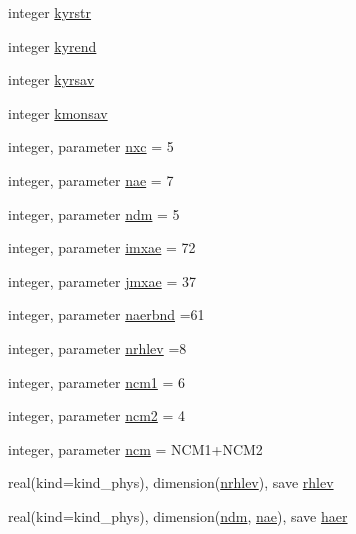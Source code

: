 \begin{DoxyCompactItemize}
\item 
integer \hyperlink{group__module__radiation__aerosols_gaf224f7d7991e3d48aeaa4d221da50f41}{kyrstr}
\item 
integer \hyperlink{group__module__radiation__aerosols_ga79127786cce93bccf8749ef8c85f6467}{kyrend}
\item 
integer \hyperlink{group__module__radiation__aerosols_ga928c08857f866e4b848873a23a1d49e7}{kyrsav}
\item 
integer \hyperlink{group__module__radiation__aerosols_ga302ae8a5aa2b8fb08ad366ef124cee45}{kmonsav}
\item 
integer, parameter \hyperlink{group__module__radiation__aerosols_ga1fffbb55ad2986a216b721a6c103c4cf}{nxc} = 5
\item 
integer, parameter \hyperlink{group__module__radiation__aerosols_ga45121ca4dcb3194e8afb4090fa810657}{nae} = 7
\item 
integer, parameter \hyperlink{group__module__radiation__aerosols_gae77b22f76f193cef19b6e6c3ee8e0773}{ndm} = 5
\item 
integer, parameter \hyperlink{group__module__radiation__aerosols_ga52cda855a397136f75768d205292ddbb}{imxae} = 72
\item 
integer, parameter \hyperlink{group__module__radiation__aerosols_gafdfdd058364062349b02cec9c712ea80}{jmxae} = 37
\item 
integer, parameter \hyperlink{group__module__radiation__aerosols_gae8ffb66e7e617f045663ce2732743b4a}{naerbnd} =61
\item 
integer, parameter \hyperlink{group__module__radiation__aerosols_gaa6d18b0588e80cb40871cc75870d09ba}{nrhlev} =8
\item 
integer, parameter \hyperlink{group__module__radiation__aerosols_gac6bc533a79d4b19129834cbc9a9fbc18}{ncm1} = 6
\item 
integer, parameter \hyperlink{group__module__radiation__aerosols_ga61dbcce5b0bb02dd31d4a37983887a7b}{ncm2} = 4
\item 
integer, parameter \hyperlink{group__module__radiation__aerosols_gab46e61a4a386794a5e9e97d8ef7d98a5}{ncm} = N\+C\+M1+N\+C\+M2
\item 
real(kind=kind\+\_\+phys), dimension(\hyperlink{group__module__radiation__aerosols_gaa6d18b0588e80cb40871cc75870d09ba}{nrhlev}), save \hyperlink{group__module__radiation__aerosols_ga6aa3218393ea05cab77ab7867cfeab90}{rhlev}
\item 
real(kind=kind\+\_\+phys), dimension(\hyperlink{group__module__radiation__aerosols_gae77b22f76f193cef19b6e6c3ee8e0773}{ndm}, \hyperlink{group__module__radiation__aerosols_ga45121ca4dcb3194e8afb4090fa810657}{nae}), save \hyperlink{group__module__radiation__aerosols_ga8ce24a58afb33dd372995bf5aaf95be9}{haer}

\end{DoxyCompactItemize}
